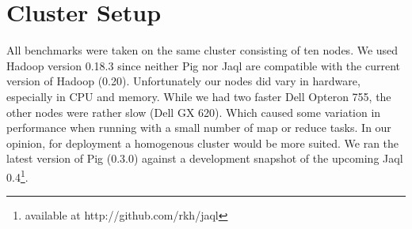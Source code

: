 \section{Cluster Setup}

All benchmarks were taken on the same cluster consisting of ten nodes. We used Hadoop version 0.18.3 since neither
Pig nor Jaql are compatible with the current version of Hadoop (0.20). Unfortunately our nodes did vary in hardware,
especially in CPU and memory. While we had two faster Dell Opteron 755, the other nodes were rather slow (Dell GX 620).
Which caused some variation in performance when running with a small number of map or reduce tasks. In our opinion,
for deployment a homogenous cluster would be more suited. We ran the latest version of Pig (0.3.0) against a development
snapshot of the upcoming Jaql 0.4\footnote{available at http://github.com/rkh/jaql}.